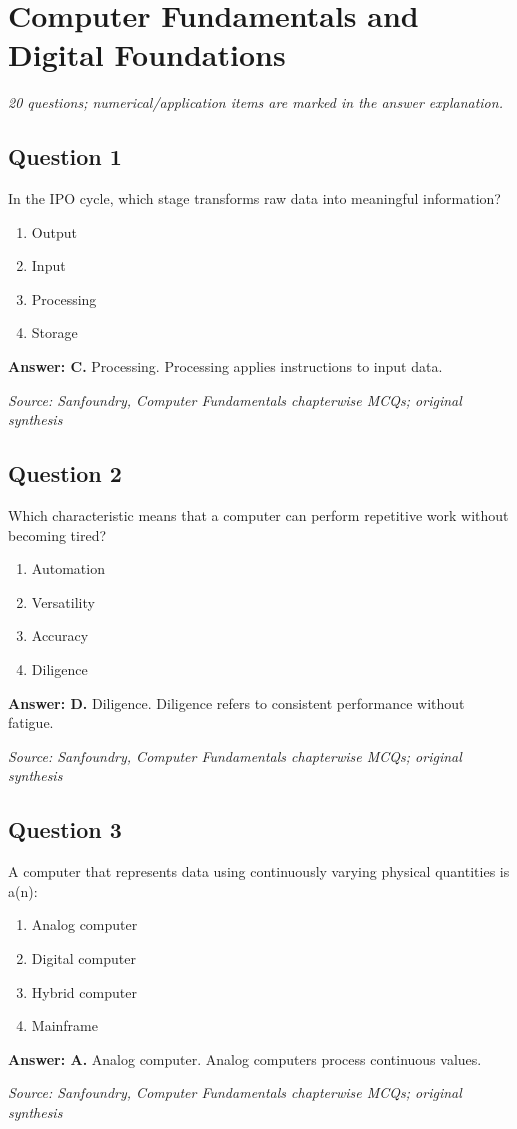 \documentclass[11pt,a4paper]{book}
\newcommand{\source}[1]{\par\smallskip\textit{Source: #1}}
\newcommand{\answer}[2]{\par\textbf{Answer: #1.} #2}
\begin{document}
\chapter{Computer Fundamentals and Digital Foundations}
\textit{20 questions; numerical/application items are marked in the answer explanation.}
\section*{Question 1}
In the IPO cycle, which stage transforms raw data into meaningful information?
\begin{enumerate}[label=\Alph*.]
\item Output
\item Input
\item Processing
\item Storage
\end{enumerate}
\answer{C}{Processing. Processing applies instructions to input data.}
\source{Sanfoundry, Computer Fundamentals chapterwise MCQs; original synthesis}
\section*{Question 2}
Which characteristic means that a computer can perform repetitive work without becoming tired?
\begin{enumerate}[label=\Alph*.]
\item Automation
\item Versatility
\item Accuracy
\item Diligence
\end{enumerate}
\answer{D}{Diligence. Diligence refers to consistent performance without fatigue.}
\source{Sanfoundry, Computer Fundamentals chapterwise MCQs; original synthesis}
\section*{Question 3}
A computer that represents data using continuously varying physical quantities is a(n):
\begin{enumerate}[label=\Alph*.]
\item Analog computer
\item Digital computer
\item Hybrid computer
\item Mainframe
\end{enumerate}
\answer{A}{Analog computer. Analog computers process continuous values.}
\source{Sanfoundry, Computer Fundamentals chapterwise MCQs; original synthesis}
\end{document}
